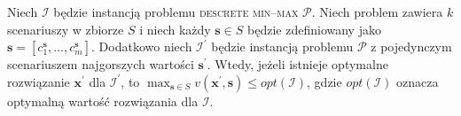 \begin{theorem}\label{th:minmaxworst}
	Niech $\mathcal{I}$ będzie instancją problemu \textsc{descrete min--max $\mathcal{P}$}. Niech problem zawiera $k$ scenariuszy w zbiorze $S$ i niech każdy $\textbf{s} \in S$ będzie zdefiniowany jako $\textbf{s} = \left[ c^{\textbf{s}}_{1}, \dots, c^{\textbf{s}}_{m} \right]$. Dodatkowo niech $\mathcal{I^{\prime}}$ będzie instancją problemu $\mathcal{P}$ z pojedynczym scenariuszem najgorszych wartości $\textbf{s}^{\prime}$. Wtedy, jeżeli istnieje optymalne rozwiązanie $\textbf{x}^{\prime}$ dla $\mathcal{I}^{\prime}$, to $\max_{\textbf{s} \in S} v \left( \textbf{x}^{\prime}, \textbf{s} \right) \leqslant opt \left( \mathcal{I} \right)$, gdzie $opt \left( \mathcal{I} \right)$ oznacza optymalną wartość rozwiązania dla $\mathcal{I}$.
\end{theorem}

